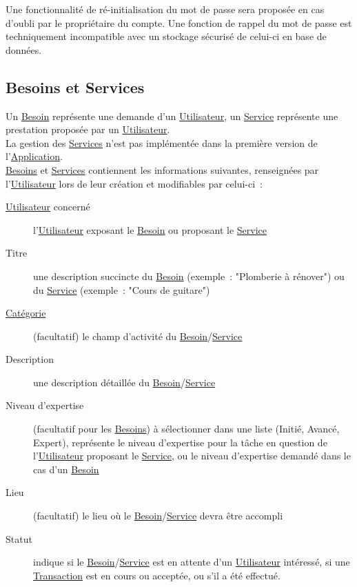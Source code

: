\documentclass[french]{article}
\begin{document}
			Une fonctionnalité de ré-initialisation du mot de passe sera proposée en
			 cas d’oubli par le propriétaire du compte. Une fonction de rappel du mot
			 de passe est techniquement incompatible avec un stockage sécurisé de
			 celui-ci en base de données.
			
		\newpage
		\subsection{Besoins et Services}
			Un \hyperlink{besoin}{Besoin} représente une demande d’un
			 \hyperlink{utilisateur}{Utilisateur}, un \hyperlink{service}{Service}
			 représente une prestation proposée par un
			 \hyperlink{utilisateur}{Utilisateur}.\\
			
			La gestion des \hyperlink{service}{Services} n’est pas implémentée dans la
			 première version de l’\hyperlink{application}{Application}.\\
			
			\hyperlink{besoin}{Besoins} et \hyperlink{service}{Services} contiennent
			 les informations suivantes, renseignées par
			 l’\hyperlink{utilisateur}{Utilisateur} lors de leur création et
			 modifiables par celui-ci :
			\begin{description}
				\item [\hyperlink{utilisateur}{Utilisateur} concerné]
					l’\hyperlink{utilisateur}{Utilisateur} exposant le
					 \hyperlink{besoin}{Besoin} ou proposant le
					 \hyperlink{service}{Service}
				\item [Titre]
					une description succincte du \hyperlink{besoin}{Besoin} (exemple :
					 "Plomberie à rénover") ou du \hyperlink{service}{Service} (exemple :
					 "Cours de guitare")
				\item [\hyperlink{categorie}{Catégorie}]
					(facultatif) le champ d’activité du
					 \hyperlink{besoin}{Besoin}/\hyperlink{service}{Service}
				\item [Description]
					une description détaillée du
					 \hyperlink{besoin}{Besoin}/\hyperlink{service}{Service}
				\item [Niveau d’expertise]
					(facultatif pour les \hyperlink{besoin}{Besoins}) à sélectionner dans
					 une liste (Initié, Avancé, Expert), représente le niveau d’expertise
					 pour la tâche en question de l’\hyperlink{utilisateur}{Utilisateur}
					 proposant le \hyperlink{service}{Service}, ou le niveau d’expertise
					 demandé dans le cas d’un \hyperlink{besoin}{Besoin}
				\item [Lieu]
					(facultatif) le lieu où le
					 \hyperlink{besoin}{Besoin}/\hyperlink{service}{Service} devra être
					 accompli
				\item [Statut]
					indique si le \hyperlink{besoin}{Besoin}/\hyperlink{service}{Service}
					 est en attente d’un \hyperlink{utilisateur}{Utilisateur} intéressé,
					 si une \hyperlink{transaction}{Transaction} est en cours ou acceptée,
					 ou s’il a été effectué.
			\end{description}
			
\end{document}
